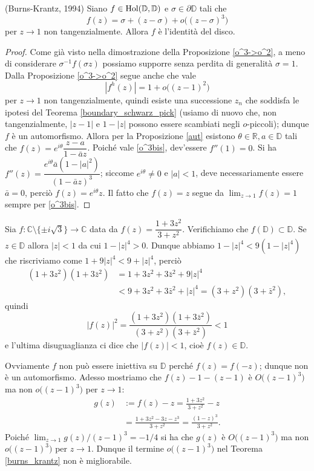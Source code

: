 \begin{thm} \label{burns_krantz}
  (Burns-Krantz, 1994) Siano $f \in \text{\normalfont{Hol}}(\mathbb{D},\mathbb{D})$ e $\sigma \in \partial\mathbb{D}$ tali che
  \begin{equation} \label{o^3bis}
    f(z)=\sigma+(z-\sigma)+o\bigl((z-\sigma)^3\bigr)
  \end{equation}
  per $z \longrightarrow 1$ non tangenzialmente. Allora $f$ è l'identità del disco.
\end{thm}

\begin{proof}
  Come già visto nella dimostrazione della Proposizione \ref{o^3->o^2}, a meno di considerare $\sigma^{-1}f(\sigma z)$ possiamo supporre senza perdita di generalità $\sigma=1$.
  Dalla Proposizione \ref{o^3->o^2} segue anche che vale
  $$|f^h(z)|=1+o\bigl((z-1)^2\bigr)$$
  per $z \longrightarrow 1$ non tangenzialmente, quindi esiste una successione $z_n$ che soddisfa le ipotesi del Teorema \ref{boundary_schwarz_pick} (usiamo di nuovo che, non tangenzialmente, $|z-1|$ e $1-|z|$ possono essere scambiati negli $o$-piccoli); dunque $f$ è un automorfismo.
  Allora per la Proposizione \ref{aut} esistono $\theta \in \mathbb{R}, a \in \mathbb{D}$ tali che $f(z)=e^{i\theta}\dfrac{z-a}{1-\bar{a}z}$. Poiché vale \eqref{o^3bis}, dev'essere $f''(1)=0$. Si ha $f''(z)=\dfrac{e^{i\theta}\bar{a}(1-|a|^2)}{(1-\bar{a}z)^3}$;
  siccome $e^{i\theta}\not=0$ e $|a|<1$, deve necessariamente essere $\bar{a}=0$, perciò $f(z)=e^{i\theta}z$. Il fatto che $f(z)=z$ segue da $\displaystyle \lim_{z \longrightarrow 1} f(z)=1$ sempre per \eqref{o^3bis}.
\end{proof}

\begin{ex}
  Sia $f:\mathbb{C}\setminus\{\pm i\sqrt{3}\} \longrightarrow \mathbb{C}$ data da $f(z)=\dfrac{1+3z^2}{3+z^2}$. Verifichiamo che $f(\mathbb{D}) \subset \mathbb{D}$. Se $z \in \mathbb{D}$ allora $|z|<1$ da cui $1-|z|^4>0$.
  Dunque abbiamo $1-|z|^4 < 9(1-|z|^4)$ che riscriviamo come $1+9|z|^4 < 9+|z|^4$, perciò
  \begin{align*}
    (1+3z^2)(1+3\bar{z}^2) &=1+3z^2+3\bar{z}^2+9|z|^4 \\
    & < 9+3z^2+3\bar{z}^2+|z|^4=(3+z^2)(3+\bar{z}^2),
  \end{align*}
  quindi
  $$|f(z)|^2=\frac{(1+3z^2)(1+3\bar{z}^2)}{(3+z^2)(3+\bar{z}^2)} < 1$$
  e l'ultima disuguaglianza ci dice che $|f(z)|<1$, cioè $f(z) \in \mathbb{D}$.

  Ovviamente $f$ non può essere iniettiva su $\mathbb{D}$ perché $f(z)=f(-z)$; dunque non è un automorfismo. Adesso mostriamo che $f(z)-1-(z-1)$ è $O\bigl((z-1)^3\bigr)$ ma non $o\bigl((z-1)^3\bigr)$ per $z \longrightarrow 1$:
  \begin{align*}
    g(z) & := f(z)-z=\frac{1+3z^2}{3+z^2}-z \\
    & =\frac{1+3z^2-3z-z^3}{3+z^2}=\frac{(1-z)^3}{3+z^2}.
  \end{align*}
  Poiché $\displaystyle \lim_{z \longrightarrow 1} g(z)/(z-1)^3=-1/4$ si ha che $g(z)$ è $O\bigl((z-1)^3\bigr)$ ma non $o\bigl((z-1)^3\bigr)$ per $z \longrightarrow 1$. Dunque il termine $o\bigl((z-1)^3\bigr)$ nel Teorema \ref{burns_krantz} non è migliorabile.
\end{ex}
